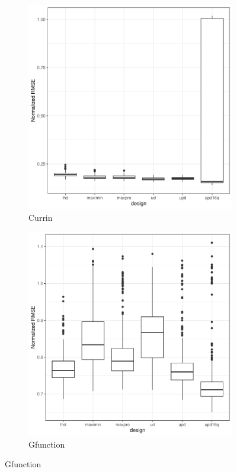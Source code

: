 \documentclass [PhD] {package/uclathes}
\begin{document}
\begin{figure}
\begin{adjustwidth}{-2cm}{-2cm}
\begin{subfigure}[b]{0.35\textwidth}
\end{subfigure}
\begin{subfigure}[b]{0.35\textwidth}
\centering
\caption{Currin}
\includegraphics[width=\textwidth]{chapters/EGO/pdfs/Currin_128x31}
\end{subfigure}
\vfill
\begin{subfigure}[b]{0.35\textwidth}
\centering
\caption{Gfunction}
\includegraphics[width=\textwidth]{chapters/EGO/pdfs/Gfunction_128x31}

\end{subfigure}
\end{adjustwidth}
\end{figure}
\end{document}
